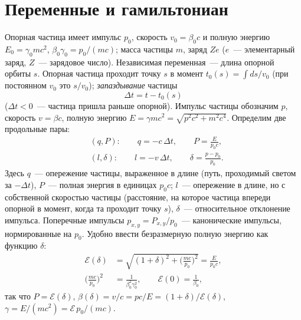 \documentclass[a4paper,11pt]{article}
\numberwithin{equation}{section}
\newcommand{\cE}{\mathcal{E}}
\begin{document}
\section{Переменные и гамильтониан}
Опорная частица имеет импульс $p_0$, скорость $v_0=\beta_0c$ и полную энергию $E_0=\gamma_0mc^2$,
$\beta_0\gamma_0=p_0/(mc)$; масса частицы $m$, заряд $Ze$ ($e$~--- элементарный заряд, $Z$~--- зарядовое число). Независимая переменная~--- длина опорной орбиты $s$. Опорная частица проходит точку $s$
в момент $t_0(s)=\int ds/v_0$ (при постоянном $v_0$ это $s/v_0$); \emph{запаздывание} частицы
\[
\Delta t = t - t_0(s)
\]
($\Delta t<0$~--- частица пришла раньше опорной). Импульс частицы обозначим $p$, скорость $v=\beta c$, полную энергию
$E=\gamma mc^2=\sqrt{p^2c^2+m^2c^4}$. Определим две продольные пары:
\begin{align}
&(q,P):\qquad q=-c\,\Delta t,\qquad P=\frac{E}{p_0c}, \label{eq:qP}\\
&(l,\delta):\qquad l=-v\,\Delta t,\qquad \delta=\frac{p-p_0}{p_0}. \label{eq:ld}
\end{align}
Здесь $q$~--- опережение частицы, выраженное в длине (путь, проходимый светом за $-\Delta t$), $P$~--- полная энергия
в единицах $p_0c$; $l$~--- опережение в длине, но с собственной скоростью частицы (расстояние, на которое частица
впереди опорной в момент, когда та проходит точку $s$), $\delta$~--- относительное отклонение импульса.
Поперечные импульсы $p_{x,y}=P_{x,y}/p_0$~--- канонические импульсы, нормированные на $p_0$.
Удобно ввести безразмерную полную энергию как функцию $\delta$:
\begin{equation}
\begin{aligned}
\cE(\delta)&=\sqrt{(1+\delta)^2+\Big(\frac{mc}{p_0}\Big)^2}=\frac{E}{p_0c},\\
\Big(\frac{mc}{p_0}\Big)^2&=\frac{1}{\beta_0^2\gamma_0^2},\qquad \cE(0)=\frac{1}{\beta_0},
\end{aligned} \label{eq:E}
\end{equation}
так что $P=\cE(\delta)$, $\beta(\delta)=v/c=pc/E=(1+\delta)/\cE(\delta)$, $\gamma=E/(mc^2)=\cE\,p_0/(mc)$.
\end{document}
